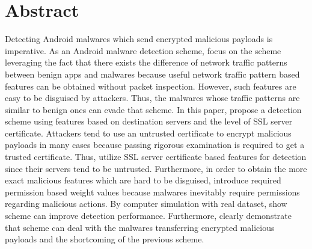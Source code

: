 \section*{Abstract} 
Detecting Android malwares which send encrypted malicious payloads is imperative.
As an Android malware detection scheme, \we focus on the scheme leveraging the fact that there exists the difference of network traffic patterns between benign apps and malwares because useful network traffic pattern based features can be obtained without packet inspection.
However, such features are easy to be disguised by attackers. 
Thus, the malwares whose traffic patterns are similar to benign ones can evade that scheme.  
In this paper, \we propose a detection scheme using features based on destination servers and the level of SSL server certificate. 
Attackers tend to use an untrusted certificate to encrypt malicious payloads in many cases because passing rigorous examination is required to get a trusted certificate. 
Thus, \we utilize SSL server certificate based features for detection since their servers tend to be untrusted. 
Furthermore, in order to obtain the more exact malicious features which are hard to be disguised, \we introduce required permission based weight values because malwares inevitably require permissions regarding malicious actions. 
By computer simulation with real dataset, \we show \our scheme can improve detection performance. 
Furthermore, \we clearly demonstrate that \our scheme can deal with the malwares transferring encrypted malicious payloads and the shortcoming of the previous scheme.
